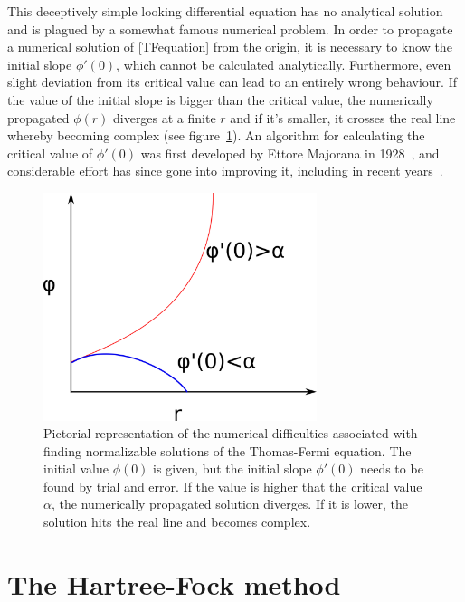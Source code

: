 This deceptively simple looking differential equation has no analytical solution and is plagued by a somewhat famous numerical problem. In order to propagate a numerical solution of \eqref{TFequation} from the origin, it is necessary to know the initial slope $\phi'(0)$, which cannot be calculated analytically. Furthermore, even slight deviation from its critical value can lead to an entirely wrong behaviour. If the value of the initial slope is bigger than the critical value, the numerically propagated $\phi(r)$ diverges at a finite $r$ and if it's smaller, it crosses the real line whereby becoming complex (see figure~\ref{TFfig}). An algorithm for calculating the critical value of $\phi'(0)$ was first developed by Ettore Majorana in 1928~\cite{1.1484144}, and considerable effort has since gone into improving it, including in recent years~\cite{LIU2015251,PARAND2017624,pub1041457795}.
\begin{figure} [t] 
	\centering
	\includegraphics[width=80mm]{Graphs/TF.png} 
	\caption{Pictorial representation of the numerical difficulties associated with finding normalizable solutions of the Thomas-Fermi equation. The initial value $\phi(0)$ is given, but the initial slope $\phi'(0)$ needs to be found by trial and error. If the value is higher that the critical value $\alpha$, the numerically propagated solution diverges. If it is lower, the solution hits the real line and becomes complex.} \label{TFfig}
\end{figure}

\section{The Hartree-Fock method}

